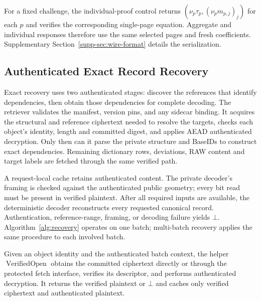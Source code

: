 \documentclass[10pt,journal]{IEEEtran}
\begin{document}
For a fixed challenge, the individual-proof control returns
$(\nu_p\tau_p,(\nu_pm_{p,j})_j)$ for each $p$ and verifies the corresponding
single-page equation. Aggregate and individual responses therefore use the
same selected pages and fresh coefficients. Supplementary
Section~\ref*{supp-sec:wire-format} details the serialization.

\subsection{Authenticated Exact Record Recovery}\label{sec:c3}
Exact recovery uses two authenticated stages: discover the references that
identify dependencies, then obtain those dependencies for complete decoding.
The retriever validates the manifest, version pins, and any sidecar binding.
It acquires the structural and reference ciphertext needed to resolve the
targets, checks each object's
identity, length and committed digest, and applies AEAD authenticated
decryption. Only then can it parse the private structure and BaseIDs to
construct exact dependencies. Remaining dictionary rows, deviations, RAW
content and target labels are fetched through the same verified path.

A request-local cache retains authenticated content. The private decoder's
framing is checked against the authenticated public geometry; every bit read
must be present in verified plaintext. After all required inputs are
available, the deterministic decoder reconstructs every requested canonical
record. Authentication, reference-range, framing, or decoding failure yields
$\bot$. Algorithm~\ref{alg:recovery} operates on one batch; multi-batch recovery
applies the same procedure to each involved batch.

Given an object identity and the authenticated batch context, the helper
$\operatorname{VerifiedOpen}$ obtains the committed ciphertext directly or
through the protected fetch interface, verifies its descriptor, and performs
authenticated decryption. It returns the verified plaintext or $\bot$ and
caches only verified ciphertext and authenticated plaintext.
\end{document}
